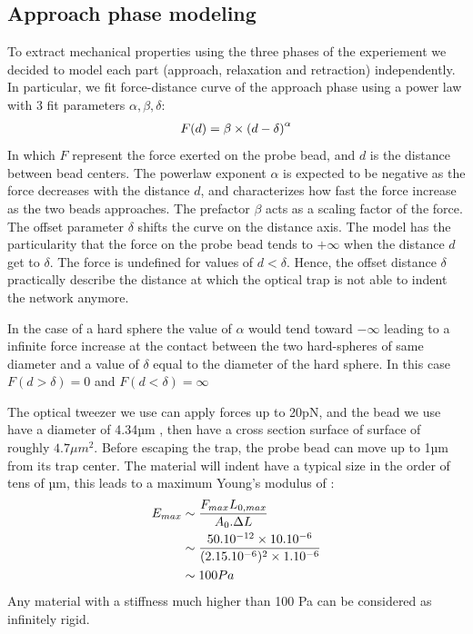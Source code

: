 \documentclass[A4paperpaper,11pt,english]{sphinxmanual}
\begin{document}
\subsection{Approach phase modeling}
\label{parts/part3:approach-phase-modeling}
To extract mechanical properties using the three phases of the experiement we
decided to model each part (approach, relaxation and retraction) independently.
In particular, we fit force-distance curve of the approach phase using a power
law with 3 fit parameters \(\alpha, \beta, \delta\):
\begin{gather}
\begin{split}F(d) = \beta \times \left(d-\delta\right)^\alpha\end{split}\notag
\end{gather}
In which \(F\) represent the force exerted on the probe bead, and \(d\)
is the distance between bead centers. The powerlaw exponent \(\alpha\) is
expected to be negative as the force decreases with the distance \(d\), and
characterizes how fast the force increase as the two
beads approaches. The prefactor \(\beta\) acts as a scaling factor of the
force. The offset parameter \(\delta\) shifts the curve on the distance
axis. The model has the particularity that the force on the probe bead tends to
\(+\infty\) when the distance \(d\) get  to \(\delta\). The force
is undefined for values of \(d< \delta\). Hence, the offset distance \(\delta\)
practically describe the distance at which the optical trap is not able to
indent the network anymore.

In the case of a hard sphere the value of \(\alpha\) would tend toward
\(-\infty\) leading to a infinite force increase at the contact between the
two hard-spheres of same diameter and a value of \(\delta\) equal to the
diameter of the hard sphere.  In this case \(F(d>\delta)=0\) and
\(F(d<\delta)=\infty\)

The optical tweezer we use can apply forces up to 20pN, and the bead we use
have a diameter of 4.34µm , then have a cross section surface of surface of roughly \(4.7\mu{}m^2\). Before
escaping the trap, the probe bead can move up to 1µm from its
trap center. The material will indent have a typical size in the order of tens of µm,  this
leads to a maximum Young's modulus of :
\begin{gather}
\begin{split}E_{max} &\sim \frac{F_{max}L_{0,max}}{A_0.\Delta L} \\
        &\sim \frac{50.10^{-12} \times 10.10^{-6} }{  (2.15.10^{-6})^2 \times 1.10^{-6}              }\\
        & \sim 100 Pa\end{split}\notag
\end{gather}
Any material with a stiffness much higher than 100 Pa can be considered as
infinitely rigid.
\end{document}
